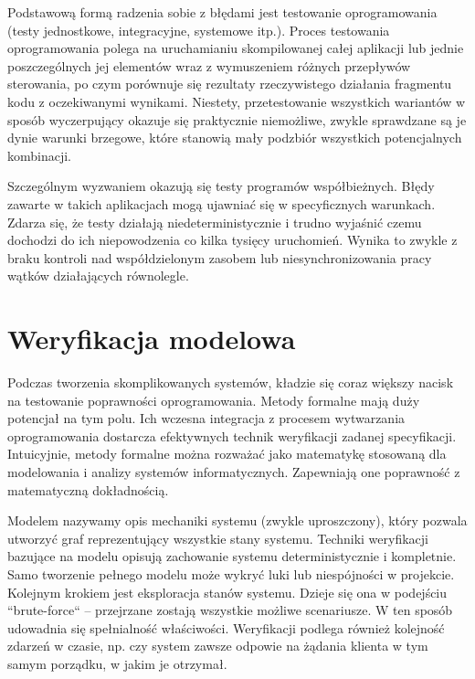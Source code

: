 Podstawową formą radzenia sobie z błędami jest testowanie oprogramowania (testy jednostkowe, integracyjne, systemowe itp.).
Proces testowania oprogramowania polega na uruchamianiu skompilowanej całej aplikacji lub jednie poszczególnych jej elementów wraz z wymuszeniem różnych przepływów sterowania, po czym porównuje się rezultaty rzeczywistego działania fragmentu kodu z oczekiwanymi wynikami.
Niestety, przetestowanie wszystkich wariantów w sposób wyczerpujący okazuje się praktycznie niemożliwe, zwykle sprawdzane są je dynie warunki brzegowe, które stanowią mały podzbiór wszystkich potencjalnych kombinacji.

Szczególnym wyzwaniem okazują się testy programów współbieżnych.
Błędy zawarte w takich aplikacjach mogą ujawniać się w specyficznych warunkach.
Zdarza się, że testy działają niedeterministycznie i trudno wyjaśnić czemu dochodzi do ich niepowodzenia co kilka tysięcy uruchomień.
Wynika to zwykle z braku kontroli nad współdzielonym zasobem lub niesynchronizowania pracy wątków działających równolegle.


\section{Weryfikacja modelowa}

Podczas tworzenia skomplikowanych systemów, kładzie się coraz większy nacisk na testowanie poprawności oprogramowania.
Metody formalne mają duży potencjał na tym polu.
Ich wczesna integracja z procesem wytwarzania oprogramowania dostarcza efektywnych technik weryfikacji zadanej specyfikacji.
Intuicyjnie, metody formalne można rozważać jako matematykę stosowaną dla modelowania i analizy systemów informatycznych.
Zapewniają one poprawność z matematyczną dokładnością.

Modelem nazywamy opis mechaniki systemu (zwykle uproszczony), który pozwala utworzyć graf reprezentujący wszystkie stany systemu.
Techniki weryfikacji bazujące na modelu opisują zachowanie systemu deterministycznie i kompletnie.
Samo tworzenie pełnego modelu może wykryć luki lub niespójności w projekcie.
Kolejnym krokiem jest eksploracja stanów systemu.
Dzieje się ona w podejściu ``brute-force`` -- przejrzane zostają wszystkie możliwe scenariusze.
W ten sposób udowadnia się spełnialność właściwości.
Weryfikacji podlega również kolejność zdarzeń w czasie, np. czy system zawsze odpowie na żądania klienta w tym samym porządku, w jakim je otrzymał.

